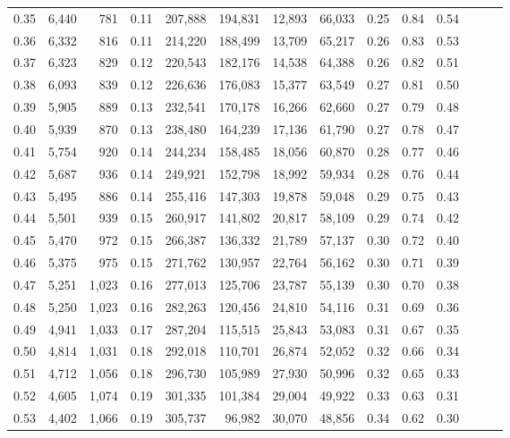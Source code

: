 \begin{tabular}{rrrrrrrrrrrrrr}
0.35 &  6,440 &    781 &  0.11 &  207,888 &  194,831 &  12,893 &  66,033 &  0.25 &  0.84 &      0.54 \\
0.36 &  6,332 &    816 &  0.11 &  214,220 &  188,499 &  13,709 &  65,217 &  0.26 &  0.83 &      0.53 \\
0.37 &  6,323 &    829 &  0.12 &  220,543 &  182,176 &  14,538 &  64,388 &  0.26 &  0.82 &      0.51 \\
0.38 &  6,093 &    839 &  0.12 &  226,636 &  176,083 &  15,377 &  63,549 &  0.27 &  0.81 &      0.50 \\
0.39 &  5,905 &    889 &  0.13 &  232,541 &  170,178 &  16,266 &  62,660 &  0.27 &  0.79 &      0.48 \\
0.40 &  5,939 &    870 &  0.13 &  238,480 &  164,239 &  17,136 &  61,790 &  0.27 &  0.78 &      0.47 \\
0.41 &  5,754 &    920 &  0.14 &  244,234 &  158,485 &  18,056 &  60,870 &  0.28 &  0.77 &      0.46 \\
0.42 &  5,687 &    936 &  0.14 &  249,921 &  152,798 &  18,992 &  59,934 &  0.28 &  0.76 &      0.44 \\
0.43 &  5,495 &    886 &  0.14 &  255,416 &  147,303 &  19,878 &  59,048 &  0.29 &  0.75 &      0.43 \\
0.44 &  5,501 &    939 &  0.15 &  260,917 &  141,802 &  20,817 &  58,109 &  0.29 &  0.74 &      0.42 \\
0.45 &  5,470 &    972 &  0.15 &  266,387 &  136,332 &  21,789 &  57,137 &  0.30 &  0.72 &      0.40 \\
0.46 &  5,375 &    975 &  0.15 &  271,762 &  130,957 &  22,764 &  56,162 &  0.30 &  0.71 &      0.39 \\
0.47 &  5,251 &  1,023 &  0.16 &  277,013 &  125,706 &  23,787 &  55,139 &  0.30 &  0.70 &      0.38 \\
0.48 &  5,250 &  1,023 &  0.16 &  282,263 &  120,456 &  24,810 &  54,116 &  0.31 &  0.69 &      0.36 \\
0.49 &  4,941 &  1,033 &  0.17 &  287,204 &  115,515 &  25,843 &  53,083 &  0.31 &  0.67 &      0.35 \\
0.50 &  4,814 &  1,031 &  0.18 &  292,018 &  110,701 &  26,874 &  52,052 &  0.32 &  0.66 &      0.34 \\
0.51 &  4,712 &  1,056 &  0.18 &  296,730 &  105,989 &  27,930 &  50,996 &  0.32 &  0.65 &      0.33 \\
0.52 &  4,605 &  1,074 &  0.19 &  301,335 &  101,384 &  29,004 &  49,922 &  0.33 &  0.63 &      0.31 \\
0.53 &  4,402 &  1,066 &  0.19 &  305,737 &   96,982 &  30,070 &  48,856 &  0.34 &  0.62 &      0.30 \\

\end{tabular}

